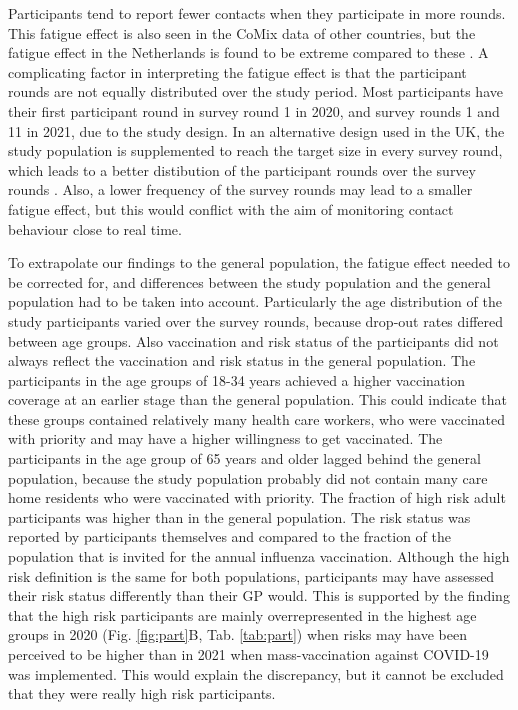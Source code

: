 \documentclass[fleqn,10pt]{wlscirep}
\begin{document}
Participants tend to report fewer contacts when they participate in more rounds. This fatigue effect is also seen in the CoMix data of other countries, but the fatigue effect in the Netherlands is found to be extreme compared to these \cite{Wong_2022b}. A complicating factor in interpreting the fatigue effect is that the participant rounds are not equally distributed over the study period. Most participants have their first participant round in survey round 1 in 2020, and survey rounds 1 and 11 in 2021, due to the study design. In an alternative design used in the UK, the study population is supplemented to reach the target size in every survey round, which leads to a better distibution of the participant rounds over the survey rounds \cite{Gimma_2022}. Also, a lower frequency of the survey rounds may lead to a smaller fatigue effect, but this would conflict with the aim of monitoring contact behaviour close to real time.

To extrapolate our findings to the general population, the fatigue effect needed to be corrected for, and differences between the study population and the general population had to be taken into account. Particularly the age distribution of the study participants varied over the survey rounds, because drop-out rates differed between age groups. Also vaccination and risk status of the participants did not always reflect the vaccination and risk status in the general population. The participants in the age groups of 18-34 years achieved a higher vaccination coverage at an earlier stage than the general population. This could indicate that these groups contained relatively many health care workers, who were vaccinated with priority and may have a higher willingness to get vaccinated. The participants in the age group of 65 years and older lagged behind the general population, because the study population probably did not contain many care home residents who were vaccinated with priority. The fraction of high risk adult participants was higher than in the general population. The risk status was reported by participants themselves and compared to the fraction of the population that is invited for the annual influenza vaccination. Although the high risk definition is the same for both populations, participants may have assessed their risk status differently than their GP would. This is supported by the finding that the high risk participants are mainly overrepresented in the highest age groups in 2020 (Fig. \ref{fig:part}B, Tab. \ref{tab:part}) when risks may have been perceived to be higher than in 2021 when mass-vaccination against COVID-19 was implemented. This would explain the discrepancy, but it cannot be excluded that they were really high risk participants. 
\end{document}
